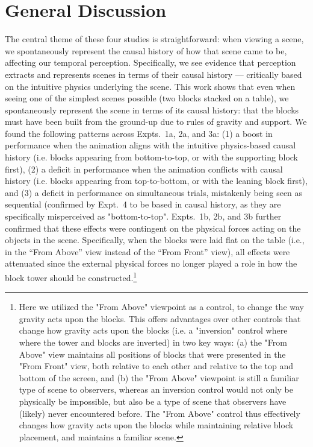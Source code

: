 \section{General Discussion}
The central theme of these four studies is straightforward: when viewing a scene, we spontaneously represent the causal history of how that scene came to be, affecting our temporal perception. Specifically, we see evidence that perception extracts and represents scenes in terms of their causal history --- critically based on the intuitive physics underlying the scene.  This work shows that even when seeing one of the simplest scenes possible (two blocks stacked on a table), we spontaneously represent the scene in terms of its causal history: that the blocks  must have been built from the ground-up due to rules of gravity and support.  We found the following patterns across Expts.~1a, 2a, and 3a:  (1) a boost in performance when the animation aligns with the intuitive physics-based causal history (i.e. blocks appearing from bottom-to-top, or with the supporting block first), (2) a deficit in performance when the animation conflicts with causal history (i.e. blocks appearing from top-to-bottom, or with the leaning block first), and (3) a deficit in performance on simultaneous trials, mistakenly being seen as sequential (confirmed by Expt.~4 to be based in causal history, as they are specifically misperceived as "bottom-to-top". Expts.~1b, 2b, and 3b further confirmed that these effects were contingent on the physical forces acting on the objects in the scene. Specifically, when the blocks were laid flat on the table (i.e., in the “From Above” view instead of the “From Front” view), all effects were attenuated since the external physical forces no longer played a role in how the block tower should be constructed.\footnote{Here we utilized the "From Above" viewpoint as a control, to change the way gravity acts upon the blocks. This offers advantages over other controls that change how gravity acts upon the blocks (i.e. a "inversion" control where where the tower and blocks are inverted) in two key ways: (a) the "From Above" view maintains all positions of blocks that were presented in the "From Front" view, both relative to each other and relative to the top and bottom of the screen, and (b) the "From Above" viewpoint is still a familiar type of scene to observers, whereas an inversion control would not only be physically be impossible, but also be a type of scene that observers have (likely) never encountered before. The "From Above" control thus effectively changes how gravity acts upon the blocks while maintaining relative block placement, and maintains a familiar scene.} 

